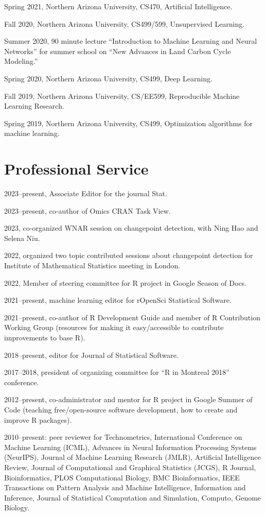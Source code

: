 \documentclass[margin,line]{res}
\newcommand{\href}[2]{#2}
\begin{document}
\begin{resume}
Spring 2021, Northern Arizona University, CS470, Artificial Intelligence.

Fall 2020, Northern Arizona University, CS499/599, Unsupervised
Learning.

Summer 2020, 90 minute lecture ``Introduction to Machine Learning and
Neural Networks'' for summer school on ``New Advances in Land Carbon
Cycle Modeling.''

Spring 2020, Northern Arizona University, CS499, Deep Learning.

Fall 2019, Northern Arizona University, CS/EE599, Reproducible Machine
Learning Research.

Spring 2019, Northern Arizona University, CS499, Optimization
algorithms for machine learning.

\section{\sc Professional Service}

2023--present, Associate Editor for the journal Stat.

2023--present, co-author of Omics CRAN Task View.

2023, co-organized WNAR session on changepoint detection, with Ning
Hao and Selena Niu.

2022, organized two topic contributed sessions about changepoint
detection for Institute of Mathematical Statistics meeting in London.

2022, Member of steering committee for R project in Google Season of Docs.

2021--present, machine learning editor for rOpenSci Statistical Software.

2021--present, co-author of
\href{https://contributor.r-project.org/rdevguide/}{R Development
  Guide} and member of R Contribution Working Group (resources for
making it easy/accessible to contribute improvements to base R).

2018--present, editor for Journal of Statistical Software.

2017--2018, president of organizing committee for ``R in Montreal
2018'' conference.

2012--present, co-administrator and mentor for R project in Google
Summer of Code (teaching free/open-source software development, how to
create and improve R packages).

2010--present: peer reviewer for Technometrics, International
Conference on Machine Learning (ICML), Advances in Neural Information
Processing Systems (NeurIPS), Journal of Machine Learning Research
(JMLR), Artificial Intelligence Review, Journal of Computational and
Graphical Statistics (JCGS), R Journal, Bioinformatics, PLOS
Computational Biology, BMC Bioinformatics, IEEE Transactions on
Pattern Analysis and Machine Intelligence, Information and Inference,
Journal of Statistical Computation and Simulation, Computo, Genome
Biology.


\end{resume}
\end{document}
